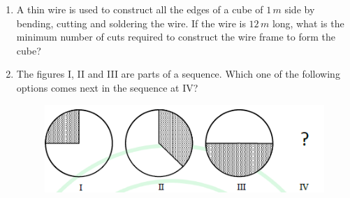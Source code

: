 \documentclass[journal,12pt,onecolumn]{IEEEtran}
\theoremstyle{remark}
\begin{document}
\begin{enumerate}
\item A thin wire is used to construct all the edges of a cube of $1\,m$ side by bending, cutting and soldering the wire. If the wire is $12\,m$ long, what is the minimum number of cuts required to construct the wire frame to form the cube? \hfill{}
\begin{enumerate}
\end{enumerate}

\item The figures I, II and III are parts of a sequence. Which one of the following options comes next in the sequence at IV?
\begin{figure}[H]
    \centering
    \includegraphics[width=0.8\columnwidth]{figs/fig1.png}
    \caption{}
    \label{fig:q5}
\end{figure}
\hfill{}
\begin{enumerate}
\end{enumerate}
\end{enumerate}
\end{document}

